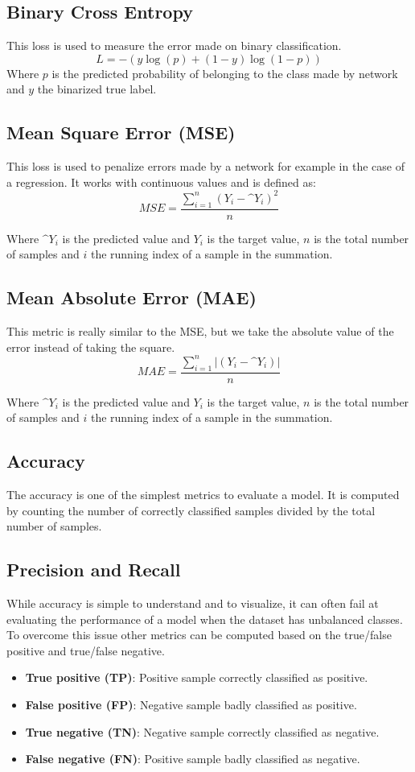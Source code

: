 \subsection{Binary Cross Entropy}
\label{sec:binary_cross_entropy}
This loss is used to measure the error made on binary classification.
$$ L = -(y\log(p) + (1-y)\log(1-p))$$
Where $p$ is the predicted probability of belonging to the class made by network and $y$ the binarized true label. 

\subsection{Mean Square Error (MSE)}
\label{sec:mean_square_error}
This loss is used to penalize errors made by a network for example in the case of a regression. It works with continuous values and is defined as:
$$ MSE = \frac{\sum_{i=1}^{n} (Y_i - \^{Y}_i)^2}{n}$$

Where $\^{Y}_i$ is the predicted value and $Y_i$ is the target value, $n$ is the total number of samples and $i$ the running index of a sample in the summation.
\subsection{Mean Absolute Error (MAE)}
This metric is really similar to the MSE, but we take the absolute value of the error instead of taking the square.
$$ MAE = \frac{\sum_{i=1}^{n} |(Y_i - \^{Y}_i)|}{n}$$

Where $\^{Y}_i$ is the predicted value and $Y_i$ is the target value, $n$ is the total number of samples and $i$ the running index of a sample in the summation.
\subsection{Accuracy}
The accuracy is one of the simplest metrics to evaluate a model. It is computed by counting the number of correctly classified samples divided by the total number of samples.


\subsection{Precision and Recall}
While accuracy is simple to understand and to visualize, it can often fail at evaluating the performance of a model when the dataset has unbalanced classes. To overcome this issue other metrics can be computed based on the true/false positive and true/false negative.

\begin{itemize}
    \item \textbf{True positive (TP)}: Positive sample correctly classified as positive. 
    \item \textbf{False positive (FP)}: Negative sample badly classified as positive. 
    \item \textbf{True negative (TN)}: Negative sample correctly classified as negative. 
    \item \textbf{False negative (FN)}: Positive sample badly classified as negative.
\end{itemize}

